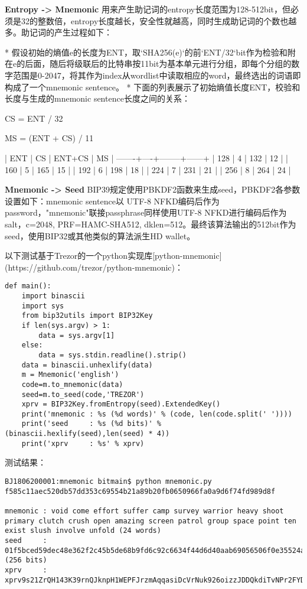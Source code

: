 \documentclass{article}
\begin{document}
\textbf{Entropy -> Mnemonic}
用来产生助记词的entropy长度范围为128-512bit，但必须是32的整数倍，entropy长度越长，安全性就越高，同时生成助记词的个数也越多。助记词的产生过程如下：

* 假设初始的熵值e的长度为ENT，取`SHA256(e)`的前`ENT/32`bit作为检验和附在e的后面，随后将级联后的比特串按11bit为基本单元进行分组，即每个分组的数字范围是0-2047，将其作为index从wordlist中读取相应的word，最终选出的词语即构成了一个mnemonic sentence。
* 下面的列表展示了初始熵值长度ENT，校验和长度与生成的mnemonic sentence长度之间的关系：


		CS = ENT / 32
		
		MS = (ENT + CS) / 11
		
		|  ENT  | CS | ENT+CS |  MS  |
		-------+----+--------+------+
		|  128  |  4 |   132  |  12  |
		|  160  |  5 |   165  |  15  |
		|  192  |  6 |   198  |  18  |
		|  224  |  7 |   231  |  21  |
		|  256  |  8 |   264  |  24  |


\textbf{Mnemonic -> Seed}
BIP39规定使用PBKDF2函数来生成seed，PBKDF2各参数设置如下：mnemonic sentence以 UTF-8 NFKD编码后作为password，"mnemonic"联接passphrase同样使用UTF-8 NFKD进行编码后作为salt，c=2048, PRF=HAMC-SHA512, dklen=512。最终该算法输出的512bit作为 seed，使用BIP32或其他类似的算法派生HD wallet。


以下测试基于Trezor的一个python实现库[python-mnemonic](https://github.com/trezor/python-mnemonic)：

\begin{lstlisting}
def main():
    import binascii
    import sys
    from bip32utils import BIP32Key
    if len(sys.argv) > 1:
        data = sys.argv[1]
    else:
        data = sys.stdin.readline().strip()
    data = binascii.unhexlify(data)
    m = Mnemonic('english')
    code=m.to_mnemonic(data)
    seed=m.to_seed(code,'TREZOR')
    xprv = BIP32Key.fromEntropy(seed).ExtendedKey()
    print('mnemonic : %s (%d words)' % (code, len(code.split(' '))))
    print('seed     : %s (%d bits)' % (binascii.hexlify(seed),len(seed) * 4))
    print('xprv     : %s' % xprv)
\end{lstlisting}

测试结果：
\begin{lstlisting}
BJ1806200001:mnemonic bitmain$ python mnemonic.py f585c11aec520db57dd353c69554b21a89b20fb0650966fa0a9d6f74fd989d8f

mnemonic : void come effort suffer camp survey warrior heavy shoot primary clutch crush open amazing screen patrol group space point ten exist slush involve unfold (24 words)
seed     : 01f5bced59dec48e362f2c45b5de68b9fd6c92c6634f44d6d40aab69056506f0e35524a518034ddc1192e1dacd32c1ed3eaa3c3b131c88ed8e7e54c49a5d0998 (256 bits)
xprv     : xprv9s21ZrQH143K39rnQJknpH1WEPFJrzmAqqasiDcVrNuk926oizzJDDQkdiTvNPr2FYDYzWgiMiC63YmfPAa2oPyNB23r2g7d1yiK6WpqaQS
\end{lstlisting}
\end{document}
